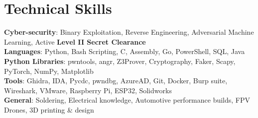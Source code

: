 \section{Technical Skills}

\begin{itemize}[leftmargin=0.15in, label={}]
    \small{\item{
        \textbf{Cyber-security}{: Binary Exploitation, Reverse Engineering, Adversarial Machine Learning, Active \textbf{Level II Secret Clearance}} \\ \vspace{1.5mm}
        \textbf{Languages}{: Python, Bash Scripting, C, Assembly, Go, PowerShell, SQL, Java} \\ \vspace{1.5mm}
        \textbf{Python Libraries}{: pwntools, angr, Z3Prover, Cryptography, Faker, Scapy, PyTorch, NumPy, Matplotlib} \\ \vspace{1.5mm}
        \textbf{Tools}{: Ghidra, IDA, Pycdc, pwndbg, AzureAD, Git, Docker,  Burp suite, Wireshark, VMware, Raspberry Pi, ESP32, Solidworks} \\ \vspace{1.5mm}
        \textbf{General}{: Soldering, Electrical knowledge, Automotive performance builds, FPV Drones, 3D printing \& design}\\
    }}
\end{itemize}